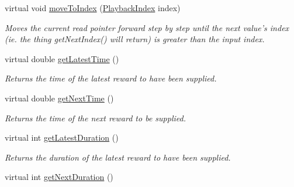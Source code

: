 \begin{DoxyCompactItemize}
virtual void \hyperlink{class_picto_1_1_reward_state_a784e710cbd93bbc245a276b691326b12}{move\-To\-Index} (\hyperlink{struct_picto_1_1_playback_index}{Playback\-Index} index)
\begin{DoxyCompactList}\small\item\em Moves the current read pointer forward step by step until the next value's index (ie. the thing get\-Next\-Index() will return) is greater than the input index. \end{DoxyCompactList}\item 
\hypertarget{class_picto_1_1_reward_state_ae23411af6432905935fec68078877995}{virtual double \hyperlink{class_picto_1_1_reward_state_ae23411af6432905935fec68078877995}{get\-Latest\-Time} ()}\label{class_picto_1_1_reward_state_ae23411af6432905935fec68078877995}

\begin{DoxyCompactList}\small\item\em Returns the time of the latest reward to have been supplied. \end{DoxyCompactList}\item 
\hypertarget{class_picto_1_1_reward_state_a196211c084d75510458fb60a9b23d1f5}{virtual double \hyperlink{class_picto_1_1_reward_state_a196211c084d75510458fb60a9b23d1f5}{get\-Next\-Time} ()}\label{class_picto_1_1_reward_state_a196211c084d75510458fb60a9b23d1f5}

\begin{DoxyCompactList}\small\item\em Returns the time of the next reward to be supplied. \end{DoxyCompactList}\item 
\hypertarget{class_picto_1_1_reward_state_a6f1c29667b4e2672443caadbe0f8d5bb}{virtual int \hyperlink{class_picto_1_1_reward_state_a6f1c29667b4e2672443caadbe0f8d5bb}{get\-Latest\-Duration} ()}\label{class_picto_1_1_reward_state_a6f1c29667b4e2672443caadbe0f8d5bb}

\begin{DoxyCompactList}\small\item\em Returns the duration of the latest reward to have been supplied. \end{DoxyCompactList}\item 
\hypertarget{class_picto_1_1_reward_state_a8a9fe068a5b0e6718343c21e5925a69f}{virtual int \hyperlink{class_picto_1_1_reward_state_a8a9fe068a5b0e6718343c21e5925a69f}{get\-Next\-Duration} ()}\label{class_picto_1_1_reward_state_a8a9fe068a5b0e6718343c21e5925a69f}


\end{DoxyCompactItemize}
